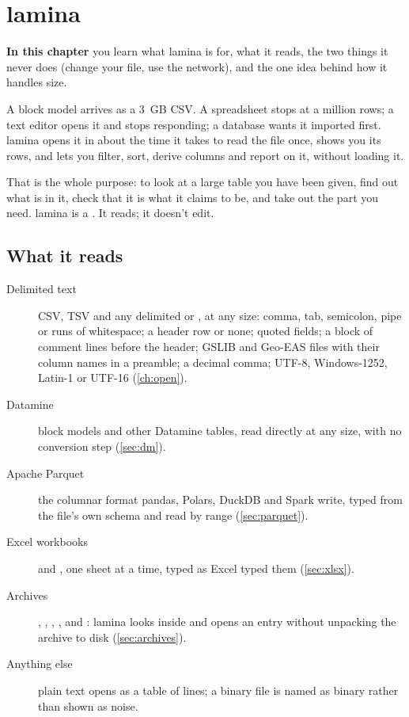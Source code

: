 \chapter{lamina}\label{ch:lamina}
\begin{goals}
\textbf{In this chapter} you learn what lamina is for, what it reads, the two things it never does
(change your file, use the network), and the one idea behind how it handles size.
\end{goals}

A block model arrives as a 3~GB CSV. A spreadsheet stops at a million rows; a text editor opens it and
stops responding; a database wants it imported first. lamina opens it in about the time it takes to read
the file once, shows you its rows, and lets you filter, sort, derive columns and report on it, without
loading it.

That is the whole purpose: to look at a large table you have been given, find out what is in it, check
that it is what it claims to be, and take out the part you need. lamina is a . It reads; it
doesn't edit.

\section{What it reads}\label{sec:reads}

\begin{description}
\item[Delimited text] CSV, TSV and any delimited  or , at any size: comma, tab,
semicolon, pipe or runs of whitespace; a header row or none; quoted fields; a block of \code{\#}
comment lines before the header; GSLIB and Geo-EAS files with their column names in a preamble; a
decimal comma; UTF-8, Windows-1252, Latin-1 or UTF-16 (\cref{ch:open}).
\item[Datamine ] block models and other Datamine tables, read directly at any size, with no
conversion step (\cref{sec:dm}).
\item[Apache Parquet] the columnar format pandas, Polars, DuckDB and Spark write, typed from the file's
own schema and read by range (\cref{sec:parquet}).
\item[Excel workbooks]  and , one sheet at a time, typed as Excel typed them
(\cref{sec:xlsx}).
\item[Archives] , , , ,  and : lamina
looks inside and opens an entry without unpacking the archive to disk (\cref{sec:archives}).
\item[Anything else] plain text opens as a table of lines; a binary file is named as binary rather than
shown as noise.
\end{description}

